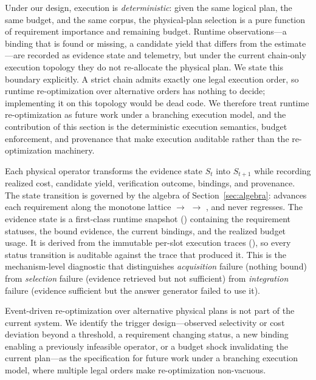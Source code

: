 Under our design, execution is \emph{deterministic}: given the same
logical plan, the same budget, and the same corpus, the physical-plan selection
is a pure function of requirement importance and remaining budget. Runtime
observations---a binding that is found or missing, a candidate yield that
differs from the estimate---are recorded as evidence state and telemetry, but
under the current chain-only execution topology they do not re-allocate the
physical plan. We state this boundary explicitly. A strict chain admits exactly
one legal execution order, so runtime re-optimization over alternative orders
has nothing to decide; implementing it on this topology would be dead code. We
therefore treat runtime re-optimization as future work under a branching
execution model, and the contribution of this section is the deterministic
execution semantics, budget enforcement, and provenance that make execution
auditable rather than the re-optimization machinery.

Each physical operator transforms the evidence state $S_t$ into $S_{t+1}$ while
recording realized cost, candidate yield, verification outcome, bindings, and
provenance. The state transition is governed by the algebra of
Section~\ref{sec:algebra}:  advances each requirement
along the monotone lattice  $\rightarrow$ 
$\rightarrow$ , and never regresses. The evidence state is a
first-class runtime snapshot () containing the requirement
statuses, the bound evidence, the current bindings, and the realized budget
usage. It is derived from the immutable per-slot execution traces
(), so every status transition is auditable
against the trace that produced it. This is the mechanism-level diagnostic that
distinguishes \emph{acquisition} failure (nothing bound) from \emph{selection}
failure (evidence retrieved but not sufficient) from \emph{integration} failure
(evidence sufficient but the answer generator failed to use it).

Event-driven re-optimization over alternative physical plans is not part of the
current system. We identify the trigger design---observed selectivity or cost
deviation beyond a threshold, a requirement changing status, a new binding
enabling a previously infeasible operator, or a budget shock invalidating the
current plan---as the specification for future work under a branching execution
model, where multiple legal orders make re-optimization non-vacuous.


